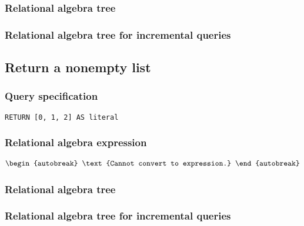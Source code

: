 \subsubsection*{Relational algebra tree}


\subsubsection*{Relational algebra tree for incremental queries}


\subsection{Return a nonempty list}

\subsubsection*{Query specification}

\begin{lstlisting}
RETURN [0, 1, 2] AS literal
\end{lstlisting}

\subsubsection*{Relational algebra expression}

\begin{align*}
\begin{autobreak}
\text{Cannot convert to expression.}
\end{autobreak}
\end{align*}

\subsubsection*{Relational algebra tree}


\subsubsection*{Relational algebra tree for incremental queries}


